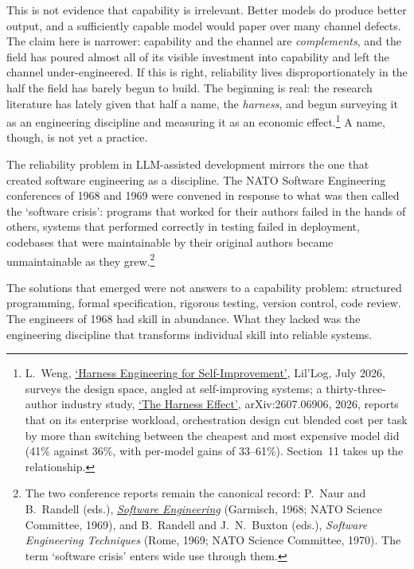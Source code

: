 \documentclass[11pt, a4paper]{article}
\begin{document}
This is not evidence that capability is irrelevant. Better models do produce better
output, and a sufficiently capable model would paper over many channel defects.
The claim here is narrower: capability and the channel
are \emph{complements}, and the field has poured almost all of its visible investment into
capability and left the channel under-engineered. If this is right, reliability lives
disproportionately in the half the field has barely begun to build. The beginning is
real: the research literature has lately given that half a name, the \emph{harness}, and
begun surveying it as an engineering discipline and measuring it as an economic
effect.\footnote{L.~Weng,
\href{https://lilianweng.github.io/posts/2026-07-04-harness/}{`Harness Engineering for
Self-Improvement'}, Lil'Log, July 2026, surveys the design space, angled at
self-improving systems; a thirty-three-author industry study,
\href{https://arxiv.org/abs/2607.06906}{`The Harness Effect'}, arXiv:2607.06906, 2026,
reports that on its enterprise workload, orchestration design cut blended cost per task
by more than switching between the cheapest and most expensive model did (41\% against
36\%, with per-model gains of 33--61\%). Section~11 takes up the relationship.} A name, though, is not yet a practice.

The reliability problem in LLM-assisted development mirrors the one that created
software engineering as a discipline. The NATO Software Engineering conferences of 1968 and 1969 were
convened in response to what was then called the `software crisis': programs that worked
for their authors failed in the hands of others, systems that performed correctly in
testing failed in deployment, codebases that were maintainable by their original authors
became unmaintainable as they grew.\footnote{The two conference reports remain the canonical
record: P.~Naur and B.~Randell (eds.), \href{http://homepages.cs.ncl.ac.uk/brian.randell/NATO/}{\textit{Software Engineering}} (Garmisch, 1968; NATO Science Committee, 1969), and
B.~Randell and J.~N.~Buxton (eds.), \textit{Software Engineering Techniques} (Rome, 1969;
NATO Science Committee, 1970). The term `software crisis' enters wide use through them.}

The solutions that emerged were not answers to a capability problem: structured
programming, formal specification, rigorous testing, version control, code review. The
engineers of 1968 had skill in abundance. What they lacked was the engineering discipline
that transforms individual skill into reliable systems.
\end{document}
